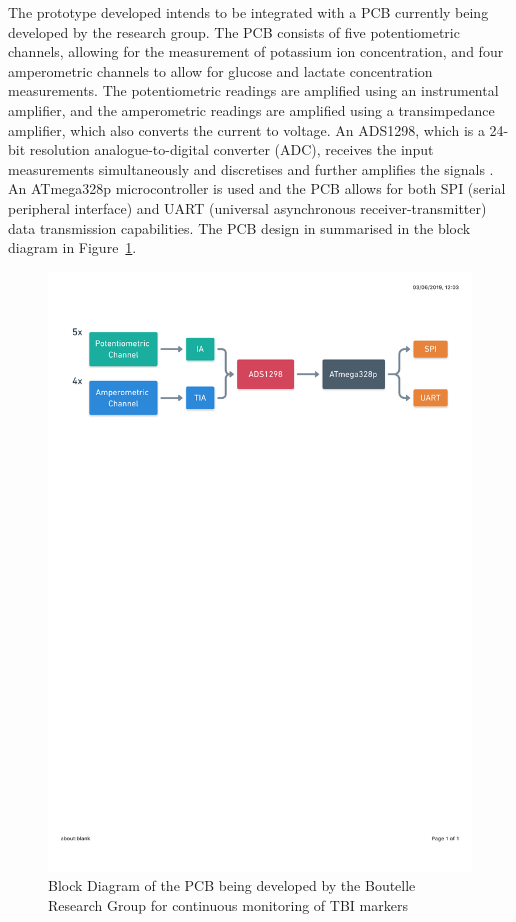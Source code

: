 The prototype developed intends to be integrated with a PCB currently being developed by the research group. The PCB consists of five potentiometric channels, allowing for the measurement of potassium ion concentration, and four amperometric channels to allow for glucose and lactate concentration measurements. The potentiometric readings are amplified using an instrumental amplifier, and the amperometric readings are amplified using a transimpedance amplifier, which also converts the current to voltage. An ADS1298, which is a 24-bit resolution analogue-to-digital converter (ADC), receives the input measurements simultaneously and discretises and further amplifies the signals \cite{TexasInstruments2010}. An ATmega328p microcontroller is used and the PCB allows for both SPI (serial peripheral interface) and UART (universal asynchronous receiver-transmitter) data transmission capabilities. The PCB design in summarised in the block diagram in Figure~\ref{fig: PCB block diagram}.

\begin{figure}[H]
\centering
\includegraphics[trim={0cm 22cm 0.5cm  2.5cm}, clip, width=1\textwidth]{./figures/CircuitBlockDiagram.pdf}
\captionsetup{justification=centering}
\caption{Block Diagram of the PCB being developed by the Boutelle Research Group for continuous monitoring of TBI markers}
\label{fig: PCB block diagram}
\end{figure}

